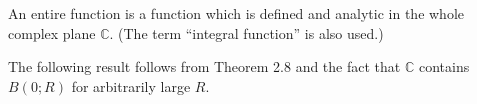 An entire function is a function which is defined and analytic in the whole complex plane $\mathbb{C}$. (The term “integral function” is also used.)

The following result follows from Theorem 2.8 and the fact that $\mathbb{C}$ contains $B(0; R)$ for arbitrarily large $R$.